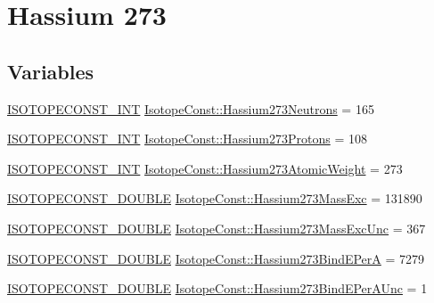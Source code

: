 \hypertarget{group___isotope_const-_hassium-_hs273}{}\section{Hassium 273}
\label{group___isotope_const-_hassium-_hs273}
\subsection*{Variables}
\begin{DoxyCompactItemize}
\item 
\mbox{\hyperlink{group___isotope_const-_macros_ga5f18360b3e99483a35c32d789e62621c}{I\+S\+O\+T\+O\+P\+E\+C\+O\+N\+S\+T\+\_\+\+I\+NT}} \mbox{\hyperlink{group___isotope_const-_hassium-_hs273_ga90ba25db577b8c02ee506304edb78236}{Isotope\+Const\+::\+Hassium273\+Neutrons}} = 165
\item 
\mbox{\hyperlink{group___isotope_const-_macros_ga5f18360b3e99483a35c32d789e62621c}{I\+S\+O\+T\+O\+P\+E\+C\+O\+N\+S\+T\+\_\+\+I\+NT}} \mbox{\hyperlink{group___isotope_const-_hassium-_hs273_ga9a9b3c0b01b787dc93f419023a1d61af}{Isotope\+Const\+::\+Hassium273\+Protons}} = 108
\item 
\mbox{\hyperlink{group___isotope_const-_macros_ga5f18360b3e99483a35c32d789e62621c}{I\+S\+O\+T\+O\+P\+E\+C\+O\+N\+S\+T\+\_\+\+I\+NT}} \mbox{\hyperlink{group___isotope_const-_hassium-_hs273_ga077ac7d68df640ccafbbda163e237ad9}{Isotope\+Const\+::\+Hassium273\+Atomic\+Weight}} = 273
\item 
\mbox{\hyperlink{group___isotope_const-_macros_ga8f45a7272ce02c0b4c65c44636ed719a}{I\+S\+O\+T\+O\+P\+E\+C\+O\+N\+S\+T\+\_\+\+D\+O\+U\+B\+LE}} \mbox{\hyperlink{group___isotope_const-_hassium-_hs273_gadcc92360992da0ac3319792a74ca2f10}{Isotope\+Const\+::\+Hassium273\+Mass\+Exc}} = 131890
\item 
\mbox{\hyperlink{group___isotope_const-_macros_ga8f45a7272ce02c0b4c65c44636ed719a}{I\+S\+O\+T\+O\+P\+E\+C\+O\+N\+S\+T\+\_\+\+D\+O\+U\+B\+LE}} \mbox{\hyperlink{group___isotope_const-_hassium-_hs273_ga66da90f56c3d51601d5e103fb6f9cdbd}{Isotope\+Const\+::\+Hassium273\+Mass\+Exc\+Unc}} = 367
\item 
\mbox{\hyperlink{group___isotope_const-_macros_ga8f45a7272ce02c0b4c65c44636ed719a}{I\+S\+O\+T\+O\+P\+E\+C\+O\+N\+S\+T\+\_\+\+D\+O\+U\+B\+LE}} \mbox{\hyperlink{group___isotope_const-_hassium-_hs273_gaac45c6e5ef876658c3a58dd26518bad1}{Isotope\+Const\+::\+Hassium273\+Bind\+E\+PerA}} = 7279
\item 
\mbox{\hyperlink{group___isotope_const-_macros_ga8f45a7272ce02c0b4c65c44636ed719a}{I\+S\+O\+T\+O\+P\+E\+C\+O\+N\+S\+T\+\_\+\+D\+O\+U\+B\+LE}} \mbox{\hyperlink{group___isotope_const-_hassium-_hs273_ga3e56754345325316330b738328d8291d}{Isotope\+Const\+::\+Hassium273\+Bind\+E\+Per\+A\+Unc}} = 1

\end{DoxyCompactItemize}
